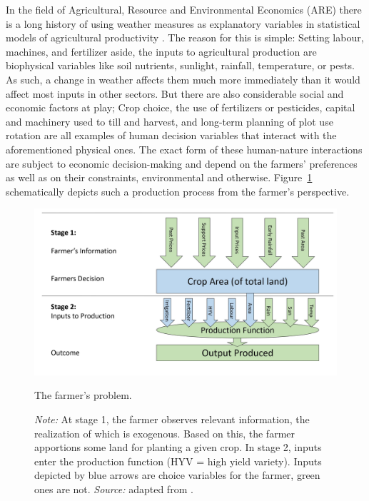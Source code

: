 \documentclass[a4paper,12pt]{article}
\theoremstyle{plain}
\theoremstyle{definition}
\theoremstyle{definition}
\theoremstyle{definition}
\theoremstyle{definition}
\begin{document}
In the field of Agricultural, Resource and Environmental Economics (ARE) there is a long history of using weather measures as explanatory variables in statistical models of agricultural productivity \citep[e.g.][]{Fisher1925}. The reason for this is simple: Setting labour, machines, and fertilizer aside, the inputs to agricultural production are biophysical variables like soil nutrients, sunlight, rainfall, temperature, or pests. As such, a change in weather affects them much more immediately than it would affect most inputs in other sectors. But there are also considerable social and economic factors at play; Crop choice, the use of fertilizers or pesticides, capital and machinery used to till and harvest, and long-term planning of plot use rotation are all examples of human decision variables that interact with the aforementioned physical ones. The exact form of these human-nature interactions are subject to economic decision-making and depend on the farmers’ preferences as well as on their constraints, environmental and otherwise.  Figure~\ref{fig:production_auffhammer} schematically depicts such a production process from the farmer's perspective.

\begin{figure}[h]
    \centering
    \includegraphics[scale=0.5]{fig_production_auffhammer.JPG}
    \caption{The farmer's problem.}
    \caption*{\footnotesize{\textit{Note:} At stage 1, the farmer observes relevant information, the realization of which is exogenous. Based on this, the farmer apportions some land for planting a given crop. In stage 2, inputs enter the production function (HYV = high yield variety). Inputs depicted by blue arrows are choice variables for the farmer, green ones are not. \textit{Source:} adapted from \citet{Auffhammer2014b}.}}
    \label{fig:production_auffhammer}
\end{figure}
\end{document}

